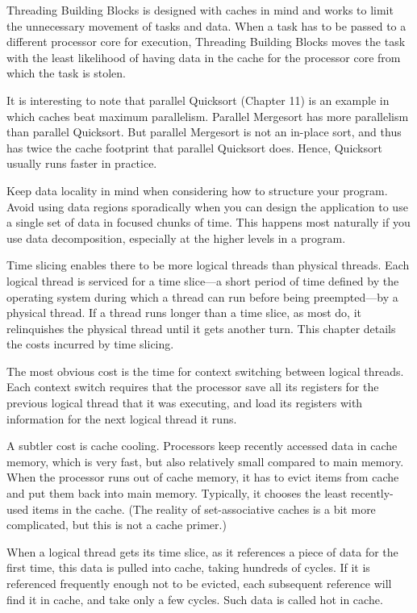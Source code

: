 Threading Building Blocks is designed with caches in mind and works to
limit the unnecessary movement of tasks and data. When a task has to
be passed to a different processor core for execution, Threading
Building Blocks moves the task with the least likelihood of having
data in the cache for the processor core from which the task is
stolen.

It is interesting to note that parallel Quicksort (Chapter 11) is an
example in which caches beat maximum parallelism. Parallel Mergesort
has more parallelism than parallel Quicksort. But parallel Mergesort
is not an in-place sort, and thus has twice the cache footprint that
parallel Quicksort does. Hence, Quicksort usually runs faster in
practice.

Keep data locality in mind when considering how to structure your
program. Avoid using data regions sporadically when you can design the
application to use a single set of data in focused chunks of
time. This happens most naturally if you use data decomposition,
especially at the higher levels in a program.


Time slicing enables there to be more logical threads than physical
threads. Each logical thread is serviced for a time slice—a short
period of time defined by the operating system during which a thread
can run before being preempted—by a physical thread. If a thread runs
longer than a time slice, as most do, it relinquishes the physical
thread until it gets another turn. This chapter details the costs
incurred by time slicing.

The most obvious cost is the time for context switching between
logical threads. Each context switch requires that the processor save
all its registers for the previous logical thread that it was
executing, and load its registers with information for the next
logical thread it runs.

A subtler cost is cache cooling. Processors keep recently accessed
data in cache memory, which is very fast, but also relatively small
compared to main memory. When the processor runs out of cache memory,
it has to evict items from cache and put them back into main
memory. Typically, it chooses the least recently-used items in the
cache. (The reality of set-associative caches is a bit more
complicated, but this is not a cache primer.)

When a logical thread gets its time slice, as it references a piece of
data for the first time, this data is pulled into cache, taking
hundreds of cycles. If it is referenced frequently enough not to be
evicted, each subsequent reference will find it in cache, and take
only a few cycles. Such data is called hot in cache.

